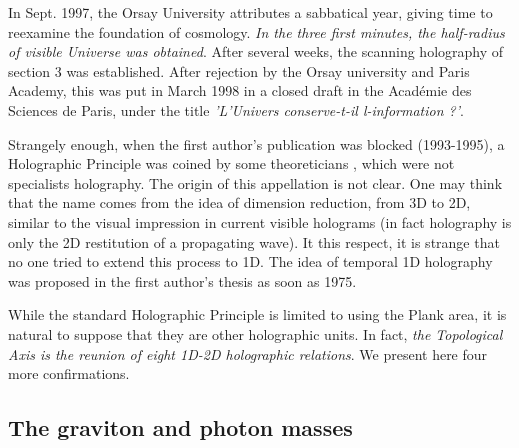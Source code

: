 \documentclass[twoside,draft]{article}
\begin{document}
\begin{sloppypar}
In Sept. 1997, the Orsay University attributes a sabbatical year, giving time to reexamine the foundation of cosmology. \textit{In the three first minutes, the half-radius of visible Universe was obtained}. After several weeks, the scanning holography of section 3 was established. After rejection by the Orsay university and Paris Academy, this was put in March 1998 in a closed draft in the Acad\'{e}mie des Sciences de Paris, under the title \textit{ 'L'Univers conserve-t-il l-information ?'}.

Strangely enough, when the first author's publication was blocked (1993-1995), a Holographic Principle was coined by some theoreticians \cite{Bousso}, which were not specialists holography. The origin of this appellation is not clear. One may think that the name comes from the idea of dimension reduction, from 3D to 2D, similar to the visual impression in current visible holograms (in fact holography is only the 2D restitution of a propagating wave). It this respect, it is strange that no one tried to extend this process to 1D. The idea of temporal 1D holography was proposed in the first author's thesis as soon as 1975. 

While the standard Holographic Principle is limited to using the Plank area, it is natural to suppose that they are other holographic units. In fact, \textit{the Topological Axis is the reunion of eight 1D-2D holographic relations}. We present here four more confirmations. 

\subsection{The graviton and photon masses}


\end{sloppypar}
\end{document}
